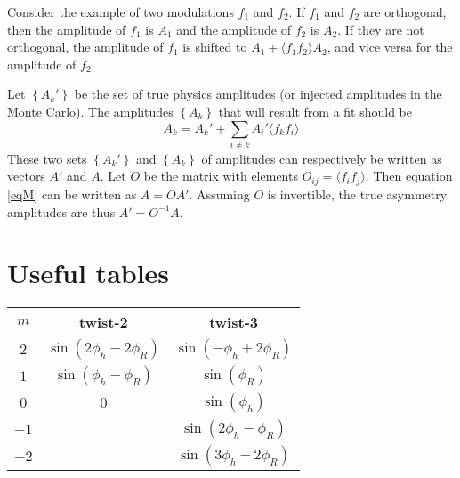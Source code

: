 \documentclass[12pt]{article}
\begin{document}
Consider the example of two modulations $f_1$ and $f_2$.
If $f_1$ and $f_2$ are orthogonal, then the amplitude of $f_1$ is $A_1$ and the
amplitude of $f_2$ is $A_2$.  If they are not orthogonal, 
the amplitude of $f_1$ is shifted to $A_1+\langle f_1f_2\rangle A_2$,
and vice versa for the amplitude of $f_2$.

Let $\left\{A_k'\right\}$ be the set of true physics amplitudes (or injected
amplitudes in the Monte Carlo).  The amplitudes $\left\{A_k\right\}$ that will result
from a fit should be 
\begin{equation}
A_k=A_k'+\sum_{i\neq k}{A_i'\langle f_kf_i\rangle}
\label{eqM}
\end{equation}
These two sets $\left\{A_k'\right\}$ and $\left\{A_k\right\}$ of amplitudes can
respectively be written as vectors $A'$ and $A$. Let $O$ be the matrix with
elements $O_{ij}=\langle f_if_j\rangle$. Then equation \ref{eqM} can be written
as $A=OA'$. Assuming $O$ is invertible, the true asymmetry amplitudes are thus
$A'=O^{-1}A$.


\section*{Useful tables}
\begin{center}
\begin{tabular}{|c|c|c|}
\hline
$m$ & twist-2 & twist-3 \\\hline\hline
$2$ & $\sin\left(2\phi_h-2\phi_R\right)$ & $\sin\left(-\phi_h+2\phi_R\right)$ \\\hline
$1$ & $\sin\left(\phi_h-\phi_R\right)$ & $\sin\left(\phi_R\right)$ \\\hline
$0$ & $0$ & $\sin\left(\phi_h\right)$ \\\hline
$-1$ & $~$ & $\sin\left(2\phi_h-\phi_R\right)$ \\\hline
$-2$ & $~$ & $\sin\left(3\phi_h-2\phi_R\right)$ \\\hline
\end{tabular}
\end{center}
\end{document}
